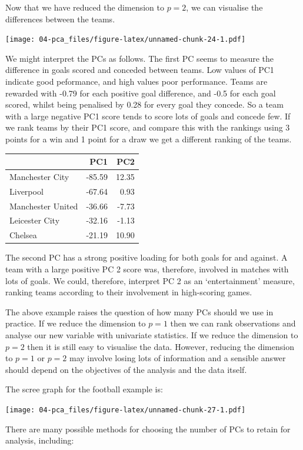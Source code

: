\documentclass[
]{book}
\theoremstyle{definition}
\theoremstyle{definition}
\theoremstyle{definition}
\theoremstyle{definition}
\theoremstyle{remark}
\begin{document}
Now that we have reduced the dimension to \(p=2\), we can visualise the differences between the teams.

\texttt{[image: 04-pca\_files/figure-latex/unnamed-chunk-24-1.pdf]}

We might interpret the PCs as follows. The first PC seems to measure the difference in goals scored and conceded between teams. Low values of PC1 indicate good peformance, and high values poor performance. Teams are rewarded with -0.79 for each positive goal difference, and -0.5 for each goal scored, whilst being penalised by 0.28 for every goal they concede. So a team with a large negative PC1 score tends to score lots of goals and concede few. If we rank teams by their PC1 score, and compare this with the rankings using 3 points for a win and 1 point for a draw we get a different ranking of the teams.

\begin{tabular}{lrr}
\toprule
  & PC1 & PC2\\
\midrule
Manchester City & -85.59 & 12.35\\
Liverpool & -67.64 & 0.93\\
Manchester United & -36.66 & -7.73\\
Leicester City & -32.16 & -1.13\\
Chelsea & -21.19 & 10.90\\
\bottomrule
\end{tabular}

The second PC has a strong positive loading for both goals for and against. A team with a large positive PC 2 score was, therefore, involved in matches with lots of goals. We could, therefore, interpret PC 2 as an `entertainment' measure, ranking teams according to their involvement in high-scoring games.

The above example raises the question of how many PCs should we use in practice. If we reduce the dimension to \(p=1\) then we can rank observations and analyse our new variable with univariate statistics. If we reduce the dimension to \(p=2\) then it is still easy to visualise the data. However, reducing the dimension to \(p=1\) or \(p=2\) may involve losing lots of information and a sensible answer should depend on the objectives of the analysis and the data itself.

The scree graph for the football example is:

\texttt{[image: 04-pca\_files/figure-latex/unnamed-chunk-27-1.pdf]}

There are many possible methods for choosing the number of PCs to retain for analysis, including:
\end{document}

